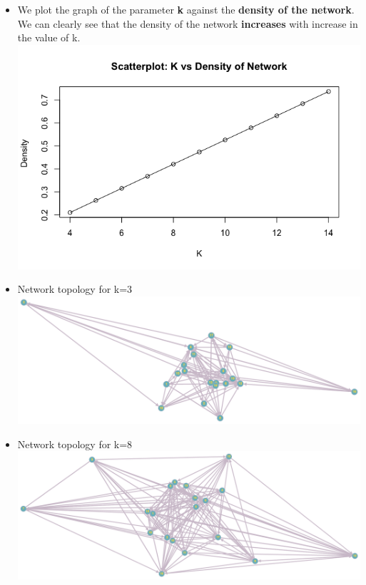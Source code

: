 \documentclass[12pt,letterpaper,titlepage,en-US]{article}
\begin{document}
\begin{itemize}
\item We plot the graph of the parameter \textbf{k} against the \textbf{density of the network}. We can clearly see that the density of the network \textbf{increases} with increase in the value of k. \\

\includegraphics[scale=0.6]{fig/density.png}


\item Network topology for k=3\\

\includegraphics[scale=0.35]{fig/k3.png}

\item Network topology for k=8\\

\includegraphics[scale=0.35]{fig/k8.png}



\end{itemize}
\end{document}

